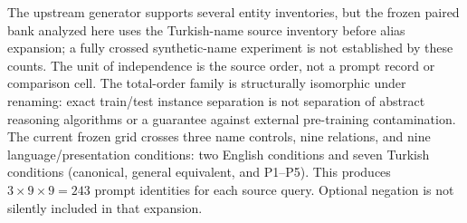 The upstream generator supports several entity inventories, but the frozen paired bank analyzed here uses
the Turkish-name source inventory before alias expansion; a fully crossed synthetic-name experiment is not
established by these counts. The unit of independence is the source order, not a prompt record or
comparison cell. The total-order family is structurally isomorphic under renaming: exact train/test
instance separation is not separation of abstract reasoning algorithms or a guarantee against external
pre-training contamination. The current frozen grid crosses three name controls, nine relations, and nine
language/presentation conditions: two English conditions and seven Turkish conditions (canonical, general
equivalent, and P1--P5). This produces $3 \times 9 \times 9 = 243$ prompt identities for each source query.
Optional negation is not silently included in that expansion.
